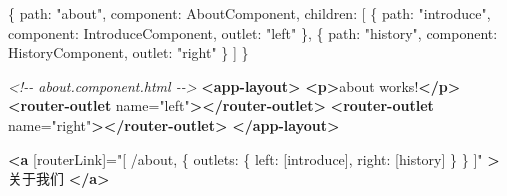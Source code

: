\documentclass[
]{article}
\newenvironment{Shaded}{}{}
\newcommand{\CommentTok}[1]{\textcolor[rgb]{0.38,0.63,0.69}{\textit{#1}}}
\newcommand{\DataTypeTok}[1]{\textcolor[rgb]{0.56,0.13,0.00}{#1}}
\newcommand{\KeywordTok}[1]{\textcolor[rgb]{0.00,0.44,0.13}{\textbf{#1}}}
\newcommand{\NormalTok}[1]{#1}
\newcommand{\OperatorTok}[1]{\textcolor[rgb]{0.40,0.40,0.40}{#1}}
\newcommand{\OtherTok}[1]{\textcolor[rgb]{0.00,0.44,0.13}{#1}}
\newcommand{\StringTok}[1]{\textcolor[rgb]{0.25,0.44,0.63}{#1}}
\begin{document}
\begin{Shaded}
\begin{Highlighting}[]
\NormalTok{\{}
  \DataTypeTok{path}\OperatorTok{:} \StringTok{"about"}\OperatorTok{,}
  \DataTypeTok{component}\OperatorTok{:}\NormalTok{ AboutComponent}\OperatorTok{,}
  \DataTypeTok{children}\OperatorTok{:}\NormalTok{ [}
\NormalTok{    \{}
      \DataTypeTok{path}\OperatorTok{:} \StringTok{"introduce"}\OperatorTok{,}
      \DataTypeTok{component}\OperatorTok{:}\NormalTok{ IntroduceComponent}\OperatorTok{,}
      \DataTypeTok{outlet}\OperatorTok{:} \StringTok{"left"}
\NormalTok{    \}}\OperatorTok{,}
\NormalTok{    \{}
      \DataTypeTok{path}\OperatorTok{:} \StringTok{"history"}\OperatorTok{,}
      \DataTypeTok{component}\OperatorTok{:}\NormalTok{ HistoryComponent}\OperatorTok{,}
      \DataTypeTok{outlet}\OperatorTok{:} \StringTok{"right"}
\NormalTok{    \}}
\NormalTok{  ]}
\NormalTok{\}}
\end{Highlighting}
\end{Shaded}

\begin{Shaded}
\begin{Highlighting}[]
\CommentTok{\textless{}!{-}{-} about.component.html {-}{-}\textgreater{}}
\KeywordTok{\textless{}app{-}layout\textgreater{}}
  \KeywordTok{\textless{}p\textgreater{}}\NormalTok{about works!}\KeywordTok{\textless{}/p\textgreater{}}
  \KeywordTok{\textless{}router{-}outlet}\OtherTok{ name=}\StringTok{"left"}\KeywordTok{\textgreater{}\textless{}/router{-}outlet\textgreater{}}
  \KeywordTok{\textless{}router{-}outlet}\OtherTok{ name=}\StringTok{"right"}\KeywordTok{\textgreater{}\textless{}/router{-}outlet\textgreater{}}
\KeywordTok{\textless{}/app{-}layout\textgreater{}}
\end{Highlighting}
\end{Shaded}

\begin{Shaded}
\begin{Highlighting}[]
\KeywordTok{\textless{}a}
\OtherTok{    [routerLink]=}\StringTok{"[}
\StringTok{      \textquotesingle{}/about\textquotesingle{},}
\StringTok{      \{}
\StringTok{        outlets: \{}
\StringTok{          left: [\textquotesingle{}introduce\textquotesingle{}],}
\StringTok{          right: [\textquotesingle{}history\textquotesingle{}]}
\StringTok{        \}}
\StringTok{      \}}
\StringTok{    ]"}
    \KeywordTok{\textgreater{}}\NormalTok{关于我们}
\KeywordTok{\textless{}/a\textgreater{}}
\end{Highlighting}
\end{Shaded}
\end{document}
